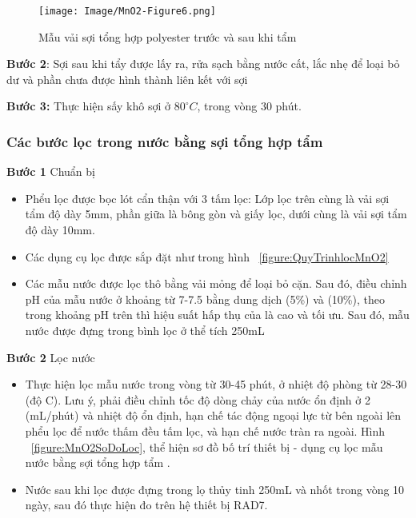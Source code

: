         \begin{figure}[htbp]
            \centering
            \texttt{[image: Image/MnO2-Figure6.png]}
            \caption{Mẫu vải sợi tổng hợp polyester trước và sau khi tẩm }
            \label{figure:MauVaiBeforeAfterMnO2}
        \end{figure}

         
        \textbf{Bước 2}: Sợi sau khi tẩy được lấy ra, rửa sạch bằng nước cất, lắc nhẹ để loại bỏ  dư và phần  chưa được hình thành liên kết với sợi
        
        \textbf{Bước 3:} Thực hiện sấy khô sợi ở $ 80^\circ C$, trong vòng 30 phút.



\subsubsection{Các bước lọc  trong nước bằng sợi tổng hợp tẩm }        
        \textbf{Bước 1} Chuẩn bị

        \begin{itemize}
            \item Phểu lọc được bọc lót cẩn thận với 3 tấm lọc: Lớp lọc trên cùng là vải sợi tẩm  độ dày 5mm, phần giữa là bông gòn và giấy lọc, dưới cùng là vải sợi tẩm  độ dày 10mm. 
            \item Các dụng cụ lọc được sắp đặt như trong hình ~\ref{figure:QuyTrinhlocMnO2}
            \item Các mẫu nước được lọc thô bằng vải mỏng để loại bỏ cặn. Sau đó, điều chỉnh pH của mẫu nước ở khoảng từ 7-7.5 bằng dung dịch  (5\%) và  (10\%), theo ~\cite{MnO2:WillardS.Moore} trong khoảng pH trên thì hiệu suất hấp thụ  của  là cao và tối ưu. Sau đó, mẫu nước được đựng trong bình lọc ở thể tích 250mL
        \end{itemize}  

        \textbf{Bước 2} Lọc nước
            \begin{itemize}
                \item Thực hiện lọc mẫu nước trong vòng từ 30-45 phút, ở nhiệt độ phòng từ 28-30 (độ C). Lưu ý, phải điều chỉnh tốc độ dòng chảy của nước ổn định ở  2 (mL/phút) và nhiệt độ ổn định, hạn chế tác động ngoại lực từ bên ngoài lên phểu lọc để nước thấm đều tấm lọc, và hạn chế nước tràn ra ngoài. Hình ~\ref{figure:MnO2SoDoLoc}, thể hiện sơ đồ bố trí thiết bị - dụng cụ lọc mẫu nước bằng sợi tổng hợp tẩm . 
                \item Nước sau khi lọc được đựng trong lọ thủy tinh 250mL và nhốt trong vòng 10 ngày, sau đó thực hiện đo trên hệ thiết bị RAD7.
            \end{itemize}


